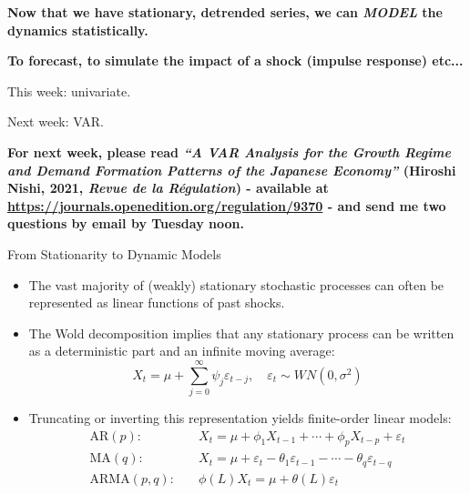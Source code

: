 \documentclass{beamer}
\begin{document}



\begin{frame}{}
  \centering
    \textbf{Now that we have stationary, detrended series, we can \textit{MODEL} the dynamics statistically.}
    
\vspace{0.3cm}

\textbf{To forecast, to simulate the impact of a shock (impulse response) etc...}

\end{frame}


\begin{frame}{}
  \centering
This week: univariate.

\vspace{0.3cm}

Next week: VAR.

\vspace{0.3cm}

\textbf{For next week, please read \textit{“A VAR Analysis for the Growth Regime and Demand Formation Patterns of the Japanese Economy”} (Hiroshi Nishi, 2021, \textit{Revue de la Régulation}) - available at \href{https://journals.openedition.org/regulation/9370}{https://journals.openedition.org/regulation/9370} - and send me \textbf{two questions by email} by \textbf{Tuesday noon}.}


\end{frame}





\begin{frame}{From Stationarity to Dynamic Models}
\begin{itemize}
    \item The vast majority of (weakly) stationary stochastic processes can often be represented as linear functions of past shocks.
    \item The Wold decomposition implies that any stationary process can be written as a deterministic part and an infinite moving average:
    \[
        X_t = \mu + \sum_{j=0}^{\infty} \psi_j \varepsilon_{t-j}, \quad \varepsilon_t \sim WN(0,\sigma^2)
    \]
    \item Truncating or inverting this representation yields finite-order linear models:
    \begin{align*}
        \text{AR}(p): &\quad X_t = \mu + \phi_1 X_{t-1} + \cdots + \phi_p X_{t-p} + \varepsilon_t\\
        \text{MA}(q): &\quad X_t = \mu + \varepsilon_t - \theta_1 \varepsilon_{t-1} - \cdots - \theta_q \varepsilon_{t-q}\\
        \text{ARMA}(p,q): &\quad \phi(L) X_t = \mu + \theta(L)\varepsilon_t
    \end{align*}
\end{itemize}
\end{frame}
\end{document}
